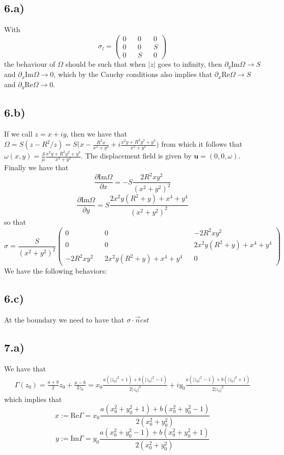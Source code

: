 \documentclass[10pt,a4paper]{book}
\begin{document}
\subsection*{6.a)}
With $$\sigma_l=\begin{pmatrix}
0 && 0 && 0\\
0 && 0 && S\\
0 && S && 0
\end{pmatrix}$$
the behaviour of $\Omega$ should be such that when $|z|$ goes to infinity, then $\partial_y\text{Im}\Omega\to S$ and $\partial_x\text{Im}\Omega\to 0$, which by the Cauchy conditions also implies that 
$\partial_x\text{Re}\Omega\to S$ and $\partial_y\text{Re}\Omega\to 0$.

\subsection*{6.b)}
If we call $z=x+iy$, then we have that $\Omega=S(z-R^2/z)=S\bigg(x-\frac{R^2x}{x^2+y^2}+i\frac{x^2y+R^2y^2+y^3}{x^2+y^2}\bigg)$ from which it follows that $\omega(x,y)=\frac{S}{\mu}\frac{x^2y+R^2y^2+y^3}{x^2+y^2}$. The displacement field is given by $\mathbf{u}=(0,0,\omega)$. Finally we have that 
$$\frac{\partial\text{Im}\Omega}{\partial x}=-S\frac{2R^2xy^2}{(x^2+y^2)^2}$$
$$\frac{\partial\text{Im}\Omega}{\partial y}=S\frac{2x^2y(R^2+y)+x^4+y^4}{(x^2+y^2)^2}$$
so that 
$$\sigma=
\frac{S}{(x^2+y^2)^2}
\begin{pmatrix}
0 && 0 && -2R^2xy^2\\
0 && 0 && 2x^2y(R^2+y)+x^4+y^4\\
-2R^2xy^2 && 2x^2y(R^2+y)+x^4+y^4 && 0
\end{pmatrix}
$$
We have the following behaviors:


\subsection*{6.c)}
At the boundary we need to have that $\sigma\cdot \vec{n}cst$


\subsection*{7.a)}
We have that 
\begin{align*}
\Gamma(z_0)=\frac{a+b}{2}z_0+\frac{a-b}{2z_0}=x_0\frac{a(|z_0|^2+1)+b(|z_0|^2-1)}{2|z_0|^2}+iy_0\frac{a(|z_0|^2-1)+b(|z_0|^2+1)}{2|z_0|^2}
\end{align*}
which implies that 
$$x:=\text{Re}\Gamma=x_0\frac{a(x_0^2+y_0^2+1)+b(x_0^2+y_0^2-1)}{2(x_0^2+y_0^2)}$$
$$y:=\text{Im}\Gamma=y_0\frac{a(x_0^2+y_0^2-1)+b(x_0^2+y_0^2+1)}{2(x_0^2+y_0^2)}$$
\end{document}
